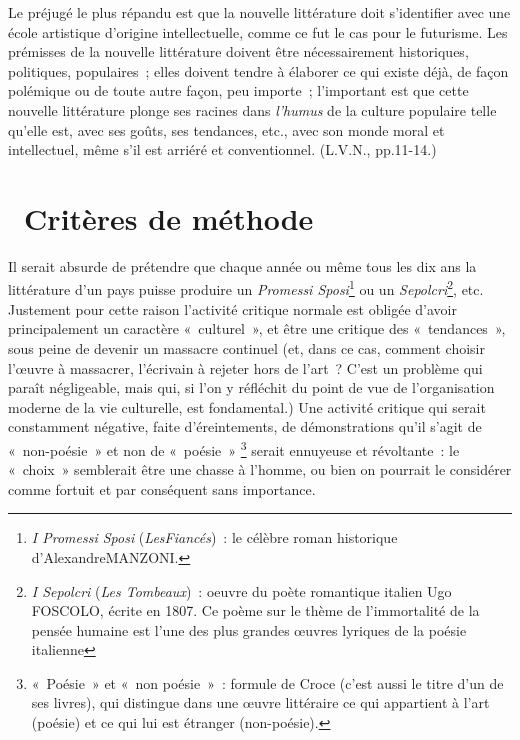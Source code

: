 \documentclass[french,twoside]{book} %
\begin{document}
Le préjugé le plus répandu est que la nouvelle littérature doit s’identifier avec une école artistique d’origine intellectuelle, comme ce fut le cas pour le futurisme. Les prémisses de la nouvelle littérature doivent être nécessairement historiques, politiques, populaires ; elles doivent tendre à élaborer ce qui existe déjà, de façon polémique ou de toute autre façon, peu importe ; l’important est que cette nouvelle littérature plonge ses racines dans \emph{l’humus} de la culture populaire telle qu’elle est, avec ses goûts, ses tendances, etc., avec son monde moral et intellectuel, même s’il est arriéré et conventionnel. (L.V.N., pp.11-14.)\par
{\raggedleft \noindent [1933]}
\section[{ Critères de méthode}]{ Critères de méthode}
\noindent Il serait absurde de prétendre que chaque année ou même tous les dix ans la littérature d’un pays puisse produire un \emph{Promessi Sposi}\footnote{\emph{I Promessi Sposi} (\emph{LesFiancés}) : le célèbre roman historique d’AlexandreMANZONI.} ou un \emph{Sepolcri}\footnote{\emph{I Sepolcri} (\emph{Les Tombeaux}) : oeuvre du poète romantique italien Ugo FOSCOLO, écrite en 1807. Ce poème sur le thème de l’immortalité de la pensée humaine est l’une des plus grandes œuvres lyriques de la poésie italienne}, etc. Justement pour cette raison l’activité critique normale est obligée d’avoir principalement un caractère « culturel », et être une critique des « tendances », sous peine de devenir un massacre continuel (et, dans ce cas, comment choisir l’œuvre à massacrer, l’écrivain à rejeter hors de l’art ? C'est un problème qui paraît négligeable, mais qui, si l’on y réfléchit du point de vue de l’organisation moderne de la vie culturelle, est fondamental.) Une activité critique qui serait constamment négative, faite d’éreintements, de démonstrations qu’il s’agit de « non-poésie » et non de « poésie » \footnote{« Poésie » et « non poésie » : formule de Croce (c’est aussi le titre d’un de ses livres), qui distingue dans une œuvre littéraire ce qui appartient à l’art (poésie) et ce qui lui est étranger (non-poésie).} serait ennuyeuse et révoltante : le « choix » semblerait être une chasse à l’homme, ou bien on pourrait le considérer comme fortuit et par conséquent sans importance.\par
\end{document}
